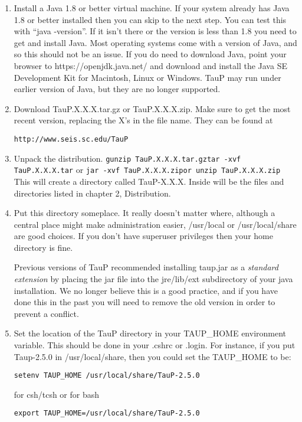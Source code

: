 \begin{enumerate}
\item Install a Java 1.8 or better virtual machine. If your system already has Java 1.8
or better installed then you can skip to the next step. You can test this
with ``java -version''. If it isn't there or the version is less than 1.8
you need to get and install Java. Most operating systems come with a version
of Java, and so this should not be an issue. If you do need to download Java,
point
your browser to https://openjdk.java.net/ and download and install
the Java SE Development Kit for Macintosh, Linux or Windows. TauP may run under earlier version of Java, but they are no longer supported.

\item Download TauP.X.X.X.tar.gz or TauP.X.X.X.zip. Make sure to get the most recent version, replacing the X's  in the file name. They can be found at

\texttt{http://www.seis.sc.edu/TauP}

\item Unpack the distribution.
\texttt{\newline gunzip TauP.X.X.X.tar.gz\newline tar -xvf TauP.X.X.X.tar\newline}
or
\texttt{\newline jar -xvf TauP.X.X.X.zip\newline or unzip TauP.X.X.X.zip}
This will create a directory called TauP-X.X.X. Inside
will be the files and directories listed in chapter 2, Distribution.

\item Put this directory someplace. It really doesn't matter where, although
a central place might make administration easier, /usr/local or
/usr/local/share are good choices. If you don't have superuser privileges
then your home directory is fine.

Previous versions of TauP recommended installing taup.jar as a \textit{standard extension} by placing the jar file into the jre/lib/ext subdirectory of your java installation. We no longer believe this is a good
practice, and if you have done this in the past you will need to remove the old version in order to
prevent a conflict.

\item Set the location of the TauP directory in your TAUP\_HOME environment variable.
This should be done in your .cshrc or .login. For instance, if you put Taup-2.5.0 in
/usr/local/share, then you could set the TAUP\_HOME to be:
\begin{verbatim}
setenv TAUP_HOME /usr/local/share/TauP-2.5.0
\end{verbatim}
for csh/tcsh or for bash
\begin{verbatim}
export TAUP_HOME=/usr/local/share/TauP-2.5.0
\end{verbatim}


\end{enumerate}
